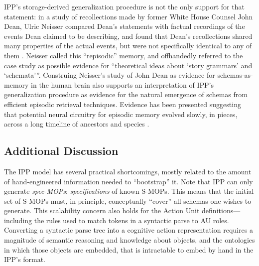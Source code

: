 IPP's storage-derived generalization procedure is not the only support for that statement: in a study of recollections made by former White House Counsel John Dean, Ulric Neisser compared Dean's statements with factual recordings of the events Dean claimed to be describing, and found that Dean's recollections shared many properties of the actual events, but were not specifically identical to any of them \citep{repisodic}. Neisser called this ``repisodic'' memory, and offhandedly referred to the case study as possible evidence for ``theoretical ideas about `story grammars' and `schemata'{}''. Construing Neisser's study of John Dean as evidence for schemas-as-memory in the human brain also supports an interpretation of IPP's generalization procedure as evidence for the natural emergence of schemas from efficient episodic retrieval techniques. Evidence has been presented suggesting that potential neural circuitry for episodic memory evolved slowly, in pieces, across a long timeline of ancestors and species \citep{allen2013evolution}.

\subsection{Additional Discussion}
The IPP model has several practical shortcomings, mostly related to the amount of hand-engineered information needed to ``bootstrap'' it. Note that IPP can only generate \textit{spec-MOPs}: \textit{specifications} of known S-MOPs. This means that the initial set of S-MOPs must, in principle, conceptually ``cover'' all schemas one wishes to generate. This scalability concern also holds for the Action Unit definitions---including the rules used to match tokens in a syntactic parse to AU roles. Converting a syntactic parse tree into a cognitive action representation requires a magnitude of semantic reasoning and knowledge about objects, and the ontologies in which those objects are embedded, that is intractable to embed by hand in the IPP's format.

